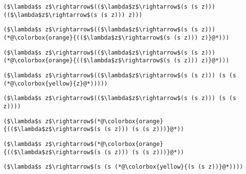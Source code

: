 \documentclass{beamer}
\begin{document}
\begin{frame}[fragile]{\CurrentSection}
\lstset{basicstyle=\ttfamily\small}\lstset{numbers=none}\lstset{language=ML}\begin{lstlisting}
($\lambda$s z$\rightarrow$(($\lambda$z$\rightarrow$(s (s z))) (($\lambda$z$\rightarrow$(s (s z))) z)))
\end{lstlisting}
\pause\lstset{language=ML}\begin{lstlisting}
($\lambda$s z$\rightarrow$(($\lambda$z$\rightarrow$(s (s z))) (*@\colorbox{orange}{(($\lambda$z$\rightarrow$(s (s z))) z)}@*)))
\end{lstlisting}

\end{frame}

\begin{frame}[fragile]{\CurrentSection}
\lstset{basicstyle=\ttfamily\small}\lstset{numbers=none}\lstset{language=ML}\begin{lstlisting}
($\lambda$s z$\rightarrow$(($\lambda$z$\rightarrow$(s (s z))) (*@\colorbox{orange}{(($\lambda$z$\rightarrow$(s (s z))) z)}@*)))
\end{lstlisting}
\pause\lstset{language=ML}\begin{lstlisting}
($\lambda$s z$\rightarrow$(($\lambda$z$\rightarrow$(s (s z))) (s (s (*@\colorbox{yellow}{z}@*)))))
\end{lstlisting}

\end{frame}

\begin{frame}[fragile]{\CurrentSection}
\lstset{basicstyle=\ttfamily\small}\lstset{numbers=none}\lstset{language=ML}\begin{lstlisting}
($\lambda$s z$\rightarrow$(($\lambda$z$\rightarrow$(s (s z))) (s (s z))))
\end{lstlisting}
\pause\lstset{language=ML}\begin{lstlisting}
($\lambda$s z$\rightarrow$(*@\colorbox{orange}{(($\lambda$z$\rightarrow$(s (s z))) (s (s z)))}@*))
\end{lstlisting}

\end{frame}

\begin{frame}[fragile]{\CurrentSection}
\lstset{basicstyle=\ttfamily\small}\lstset{numbers=none}\lstset{language=ML}\begin{lstlisting}
($\lambda$s z$\rightarrow$(*@\colorbox{orange}{(($\lambda$z$\rightarrow$(s (s z))) (s (s z)))}@*))
\end{lstlisting}
\pause\lstset{language=ML}\begin{lstlisting}
($\lambda$s z$\rightarrow$(s (s (*@\colorbox{yellow}{(s (s z))}@*))))
\end{lstlisting}

\end{frame}
\end{document}
